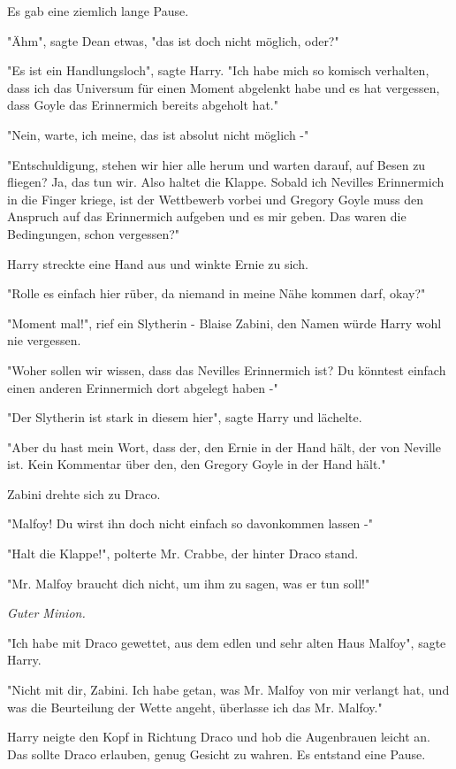 {Es gab eine ziemlich lange Pause.

"Ähm", sagte Dean etwas, "das ist doch nicht möglich, oder?"

"Es ist ein Handlungsloch", sagte Harry. "Ich habe mich so komisch verhalten, dass ich das Universum für einen Moment abgelenkt habe und es hat vergessen, dass Goyle das Erinnermich bereits abgeholt hat."

"Nein, warte, ich meine, das ist absolut nicht möglich -"

"Entschuldigung, stehen wir hier alle herum und warten darauf, auf Besen zu fliegen? Ja, das tun wir. Also haltet die Klappe. Sobald ich Nevilles Erinnermich in die Finger kriege, ist der Wettbewerb vorbei und Gregory Goyle muss den Anspruch auf das Erinnermich aufgeben und es mir geben. Das waren die Bedingungen, schon vergessen?"

Harry streckte eine Hand aus und winkte Ernie zu sich.

"Rolle es einfach hier rüber, da niemand in meine Nähe kommen darf, okay?"

"Moment mal!", rief ein Slytherin - Blaise Zabini, den Namen würde Harry wohl nie vergessen.

"Woher sollen wir wissen, dass das Nevilles Erinnermich ist? Du könntest einfach einen anderen Erinnermich dort abgelegt haben -"

"Der Slytherin ist stark in diesem hier", sagte Harry und lächelte.

"Aber du hast mein Wort, dass der, den Ernie in der Hand hält, der von Neville ist. Kein Kommentar über den, den Gregory Goyle in der Hand hält."

Zabini drehte sich zu Draco.

"Malfoy! Du wirst ihn doch nicht einfach so davonkommen lassen -"

"Halt die Klappe!", polterte Mr. Crabbe, der hinter Draco stand.

"Mr. Malfoy braucht dich nicht, um ihm zu sagen, was er tun soll!"

\emph{Guter Minion.}

"Ich habe mit Draco gewettet, aus dem edlen und sehr alten Haus Malfoy", sagte Harry.

"Nicht mit dir, Zabini. Ich habe getan, was Mr. Malfoy von mir verlangt hat, und was die Beurteilung der Wette angeht, überlasse ich das Mr. Malfoy."

Harry neigte den Kopf in Richtung Draco und hob die Augenbrauen leicht an. Das sollte Draco erlauben, genug Gesicht zu wahren. Es entstand eine Pause.

}
